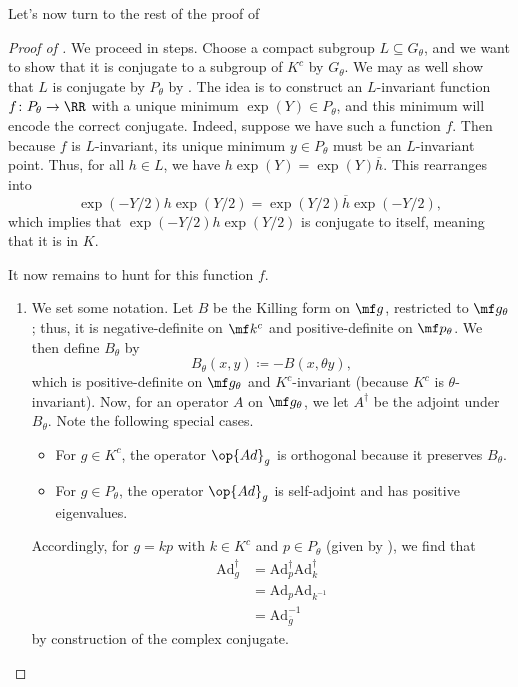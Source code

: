\documentclass[../notes.tex]{subfiles}
\begin{document}
Let's now turn to the rest of the proof of 
\begin{proof}[Proof of ]
	We proceed in steps. Choose a compact subgroup $L\subseteq G_\theta$, and we want to show that it is conjugate to a subgroup of $K^c$ by $G_\theta$. We may as well show that $L$ is conjugate by $P_\theta$ by . The idea is to construct an $L$-invariant function $f\colon P_\theta\to\RR$ with a unique minimum $\exp(Y)\in P_\theta$, and this minimum will encode the correct conjugate. Indeed, suppose we have such a function $f$. Then because $f$ is $L$-invariant, its unique minimum $y\in P_\theta$ must be an $L$-invariant point. Thus, for all $h\in L$, we have $h\exp(Y)=\exp(Y)\overline h$. This rearranges into
	\[\exp(-Y/2)h\exp(Y/2)=\exp(Y/2)\overline h\exp(-Y/2),\]
	which implies that $\exp(-Y/2)h\exp(Y/2)$ is conjugate to itself, meaning that it is in $K$.

	It now remains to hunt for this function $f$.
	\begin{enumerate}
		\setcounter{enumi}{0}
		\item We set some notation. Let $B$ be the Killing form on $\mf g$, restricted to $\mf g_\theta$; thus, it is negative-definite on $\mf k^c$ and positive-definite on $\mf p_\theta$. We then define $B_\theta$ by
		\[B_\theta(x,y)\coloneqq-B(x,\theta y),\]
		which is positive-definite on $\mf g_\theta$ and $K^c$-invariant (because $K^c$ is $\theta$-invariant). Now, for an operator $A$ on $\mf g_\theta$, we let $A^\dagger$ be the adjoint under $B_\theta$. Note the following special cases.
		\begin{itemize}
			\item For $g\in K^c$, the operator $\op{Ad}_g$ is orthogonal because it preserves $B_\theta$.
			\item For $g\in P_\theta$, the operator $\op{Ad}_g$ is self-adjoint and has positive eigenvalues.
		\end{itemize}
		Accordingly, for $g=kp$ with $k\in K^c$ and $p\in P_\theta$ (given by ), we find that
		\begin{align*}
			\mathrm{Ad}_g^\dagger &= \mathrm{Ad}_p^\dagger\mathrm{Ad}_k^\dagger \\
			&= \mathrm{Ad}_p\mathrm{Ad}_{k^{-1}} \\
			&= \mathrm{Ad}_{\overline g}^{-1}
		\end{align*}
		by construction of the complex conjugate.


\end{enumerate}
\end{proof}
\end{document}

